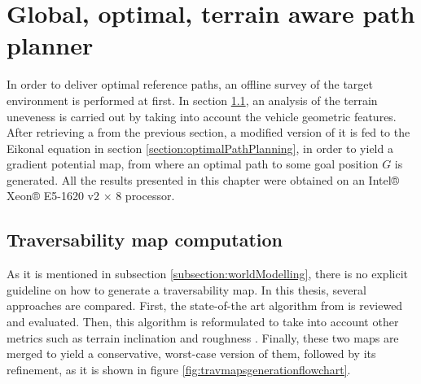 
\chapter{Global, optimal, terrain aware path planner}
\label{chapter:globalpathplanner}

In order to deliver optimal reference paths, an offline survey of the target environment is performed at first. In section \ref{section:costMap}, an analysis of the terrain uneveness is carried out by taking into account the vehicle geometric features. After retrieving a  from the previous section, a modified version of it is fed to the Eikonal equation in section \ref{section:optimalPathPlanning}, in order to yield a gradient potential map, from where an optimal path to some goal position $G$ is generated. All the results presented in this chapter were obtained on an Intel® Xeon® E5-1620 v2 × 8 processor.

\section{Traversability map computation}
\label{section:costMap}

As it is mentioned in subsection \ref{subsection:worldModelling}, there is no explicit guideline on how to generate a traversability map. In this thesis, several approaches are compared. First, the state-of-the art algorithm from \citet{Amorim2014} is reviewed and evaluated. Then, this algorithm is reformulated to take into account other metrics such as terrain inclination and roughness \cite{Ishigami2007PathPlanning}. Finally, these two maps are merged to yield a conservative, worst-case version of them, followed by its refinement, as it is shown in figure \ref{fig:travmapsgenerationflowchart}.

